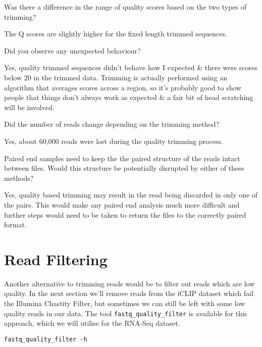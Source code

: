 \begin{questions}
Was there a difference in the range of quality scores based on the two types of trimming? \\
\begin{answer}
The Q scores are slightly higher for the fixed length trimmed sequences. \\
\end{answer}

Did you observe any unexpected behaviour? \\
\begin{answer}
Yes, quality trimmed sequences didn't behave how I expected \& there were scores below 20 in the trimmed data.
Trimming is actually performed using an algorithm that averages scores across a region, so it's probably good to show people that things don't always work as expected \& a fair bit of head scratching will be involved. \\
\end{answer}

Did the number of reads change depending on the trimming method? \\
\begin{answer}
Yes, about 60,000 reads were lost during the quality trimming process. \\
\end{answer}

Paired end samples need to keep the the paired structure of the reads intact between files.
Would this structure be potentially disrupted by either of these methods? \\
\begin{answer}
Yes, quality based trimming may result in the read being discarded in only one of the pairs. 
This would make any paired end analysis much more difficult and further steps would need to be taken to return the files to the correctly paired format.\\
\end{answer}
\end{questions}

\section{Read Filtering}
Another alternative to trimming reads would be to filter out reads which are low quality.
In the next section we'll remove reads from the iCLIP dataset which fail the Illumina Chastity Filter, but sometimes we can still be left with some low quality reads in our data. 
The tool \texttt{fastq_quality_filter} is available for this approach, which we will utilise for the RNA-Seq dataset.
\begin{lstlisting}
fastq_quality_filter -h
\end{lstlisting}

